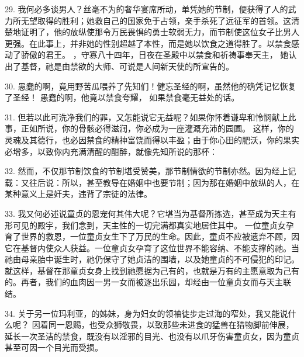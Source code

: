 29. 我何必多谈男人？丝毫不为的奢华宴席所动，单凭她的节制，便获得了人的武力所无望取得的胜利；她救自己的国家免于占领，亲手杀死了远征军的首领。这清楚地证明了，他的放纵使那令万民畏惧的勇士软弱无力，而节制使这位女子比男人更强。在此事上，并非她的性别超越了本性，而是她以饮食之道得胜了。以禁食感动了骄傲的君王。 ，守寡八十四年，日夜在圣殿中以禁食和祈祷事奉天主， 她认出了基督，祂是由禁欲的大师、可说是人间新天使的所宣告的。\par

30. 愚蠢的啊，竟用野苦瓜喂养了先知们！健忘圣经的啊，虽然他的确凭记忆恢复了圣经！ 愚蠢的啊，他竟以禁食夸耀， 如果禁食毫无益处的话。\par

31. 但若以此可洗净我们的罪，又怎能说它无益呢？如果你怀着谦卑和怜悯献上此事，正如所说，你的骨骸必得滋润，你必成为一座灌溉充沛的园圃。 这样，你的灵魂及其德行，也必因禁食的精神富饶而得以丰盈；由于你心田的肥沃，你的果实必增多，以致你内充满清醒的酣醉，就像先知所说的那杯：\par

32. 然而，不仅那节制饮食的节制堪受赞美，那节制情欲的节制亦然。因为经上记载：又往后说：所以，甚至教导在婚姻中也要节制；因为那在婚姻中放纵的人，在某种意义上是奸夫，违背了宗徒的法律。\par

33. 我又何必述说童贞的恩宠何其伟大呢？它堪当为基督所拣选，甚至成为天主有形可见的殿宇，我们念到，天主性的一切完满都真实地居住其中。 一位童贞女孕育了世界的救恩，一位童贞女生下了万民的生命。因此，童贞不应被遗弃不顾，因它在基督内使众人获益。一位童贞女孕育了这位世界不能容纳、不能支撑的祂。当祂由母亲胎中诞生时，祂仍保守了她贞洁的围墙，以及她童贞的不可侵犯的印记。就这样，基督在那童贞女身上找到祂愿据为己有的，也就是万有的主愿意取为己有的。再者，我们的血肉因一男一女而被逐出乐园，却经由一位童贞女而与天主联结。\par

34. 关于另一位玛利亚，的姊妹，身为妇女的领袖徒步走过海的窄处，我又能说什么呢？ 因着同一恩赐，也受众狮敬畏，以致那些未进食的猛兽在猎物脚前伸展，延长一次圣洁的禁食，既没有以淫邪的目光、也没有以爪牙伤害童贞女，因为童贞甚至可因一个目光而受损。\par

